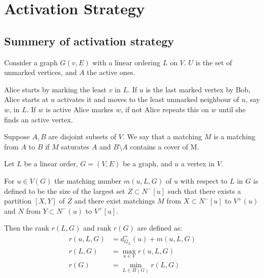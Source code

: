 \section{Activation Strategy}
\subsection{Summery of activation strategy}

Consider a graph $G(v,E)$ with a linear ordering $L$ on $V$. $U$ is the set of unmarked vertices, and $A$ the active ones.

Alice starts by marking the least $v$ in $L$. If $u$ is the last marked vertex by Bob, Alice starts at $u$ activates it and moves to the least unmarked neighbour of $u$, say $w$, in $L$. If $w$ is active Alice markes $w$, if not Alice repeats this on $w$ until she finds an active vertex.


\begin{definition} \label{defnRank}
    Suppose $A,B$ are disjoint subsets of $V$. We say that a matching $M$ is a matching from $A$ to $B$ if $M$ saturates $A$ and $B\setminus A$ contains a cover of M. 
    
    Let $L$ be a linear order, $G=(V,E)$ be a graph, and $u$ a vertex in $V$.
        
    For $u \in V(G)$ the matching number $m(u, L, G)$ of $u$ with respect to $L$ in $G$ is defined to be the size of the largest set $Z \subset N^-[u]$ such that there exists a partition $[X, Y]$ of $Z$ and there exist matchings $M$ from
    $X\subset N^-[u]$ to $V^+(u)$ and $N$ from $Y\subset N^-(u)$ to $V^+[u]$.
    
    Then the rank $r(L,G)$ and rank $r(G)$ are defined as:
    \begin{align*}
    	r(u,L,G) & = d^+_{G_L}(u) + m(u,L,G) \\
    	r(L,G)   & = \max_{u \in V}r(u,L,G)  \\
    	r(G)     & = \min_{L \in \Pi(G)} r(L,G)
    \end{align*}
\end{definition}

